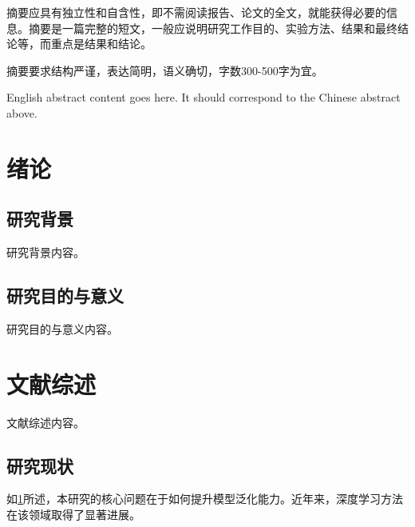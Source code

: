 \documentclass[
    degree=doctor,
    StudentName=张三,
    StudentNameEng={San Zhang},
    StudentID=2020123456,
    AdvisorName=李四,
    AdvisorNameEng={Si Li},
    AdvisorNameEngOut={Wu Wang},
    Major=计算机科学与技术,
    Department=计算机学院,
    DepartmentEng={College of Computer Science},
    ResearchInterest=人工智能,
    SubmitYear=2024,
    SubmitMonth=6,
    SubmitDay=1,
    DefenseYear=2024,
    DefenseMonth=6,
    DefenseDay=15,
    DefenseDateEng={June 15, 2024},
    CLCNumber=TP391,
    UDCNumber=004.9,
    Title=基于某某方法的某课题研究,
    TitleEng={Research on Some Topic Based on Some Method}
]{cauc_thesis}
\begin{document}
\frontmatter

\makecover

\begin{abstract-zh}
    摘要应具有独立性和自含性，即不需阅读报告、论文的全文，就能获得必要的信息。摘要是一篇完整的短文，一般应说明研究工作目的、实验方法、结果和最终结论等，而重点是结果和结论。

    摘要要求结构严谨，表达简明，语义确切，字数300-500字为宜。

\end{abstract-zh}

\begin{abstract-en}
    English abstract content goes here. It should correspond to the Chinese abstract above.

\end{abstract-en}

\makefrontmatter
\printnomenclature

\mainmatter

\chapter{绪论}\label{ch:intro}


\section{研究背景}

研究背景内容。

\section{研究目的与意义}

研究目的与意义内容。

\chapter{文献综述}

文献综述内容。

\section{研究现状}

如\cref{ch:intro}所述，本研究的核心问题在于如何提升模型泛化能力。近年来，深度学习方法在该领域取得了显著进展。
\end{document}
